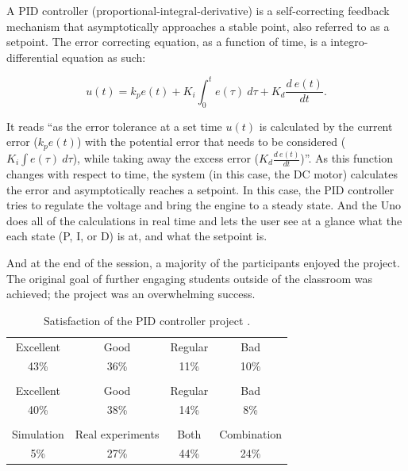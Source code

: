 \documentclass[11pt,letterpaper,twocolumn]{article}
\begin{document}
A PID controller (proportional-integral-derivative) is a self-correcting feedback mechanism that asymptotically approaches a stable point, also referred to as a setpoint. The error correcting equation, as a function of time, is a integro-differential equation as such:

\begin{equation}
    u(t) = k_p e(t) + K_i \int _0 ^t e(\tau) \ d\tau + K_d \frac{d \ e(t)}{dt}.
\end{equation}

It reads ``as the error tolerance at a set time $u(t)$ is calculated by the current error ($k_p e(t)$) with the potential error that needs to be considered ($K_i \int e(\tau) \ d\tau$), while taking away the excess error ($K_d \frac{d \ e(t)}{dt}$)''. As this function changes with respect to time, the system (in this case, the DC motor) calculates the error and asymptotically reaches a setpoint. In this case, the PID controller tries to regulate the voltage and bring the engine to a steady state. And the Uno does all of the calculations in real time and lets the user see at a glance what the each state (P, I, or D) is at, and what the setpoint is.

And at the end of the session, a majority of the participants enjoyed the project. The original goal of further engaging students outside of the classroom was achieved; the project was an overwhelming success.

\begin{table}[!h]
  \begin{tabularx}{\linewidth}{|C|C|C|C|}
    \hline {}
     \\
    \hline

    Excellent & Good & Regular & Bad \\
    43\% & 36\% & 11\% & 10\% \\

    \hline {}
     \\
    \hline

    Excellent & Good & Regular & Bad \\
    40\% & 38\% & 14\% & 8\% \\

    \hline {}
     \\
    \hline

    \footnotesize Simulation & \footnotesize Real experiments & \footnotesize Both & \footnotesize Combination \\
    5\% & 27\% & 44\% & 24\% \\ \hline

  \end{tabularx}

  \caption{Satisfaction of the PID controller project \cite{engineering}.}
\end{table}
\end{document}
